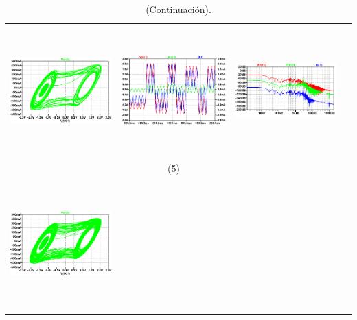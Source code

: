 \documentclass{rbf}
\begin{document}
\begin{table}[h]
    \centering
    \caption{\label{tab:r_0 fijo y variando R CCC modificado}(Continuación).}
    \begin{tabular}{c c c c}
        \hline 
        \includegraphics[width=5cm,height=5cm]{R7/1419atractorC.png}&
        \includegraphics[width=5cm,height=5cm]{R7/1419tsC.png}&
        \includegraphics[width=5cm,height=5cm]{R7/1419fftC.png}&\\
        & (5) &  \\
        \includegraphics[width=5cm,height=5cm]{R7/1419.44 C220 800m atractor.png}&

\end{tabular}
\end{table}
\end{document}
